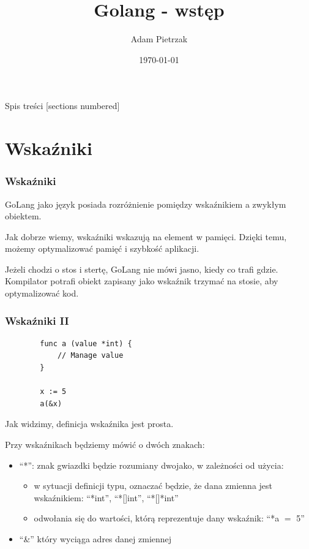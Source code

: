 \documentclass[10pt]{beamer}
\title{Golang - wstęp}
\date{\today}
\author{Adam Pietrzak}
\institute{}
\newcommand{\quotes}[1]{``#1''}
\begin{document}
\maketitle

\begin{frame}{Spis treści}
  [sections numbered]
  \tableofcontents%
\end{frame}

\section[Wskaźniki]{Wskaźniki}
\begin{frame}[fragile]
    \frametitle{Wskaźniki}
    GoLang jako język posiada rozróżnienie pomiędzy wskaźnikiem a zwykłym obiektem.

    Jak dobrze wiemy, wskaźniki wskazują na element w pamięci. Dzięki temu, 
    możemy optymalizować pamięć i szybkość aplikacji.

    Jeżeli chodzi o stos i stertę, GoLang nie mówi jasno, kiedy co trafi gdzie.
    Kompilator potrafi obiekt zapisany jako wskaźnik trzymać na stosie, aby
    optymalizować kod.
\end{frame}

\begin{frame}[fragile]
    \frametitle{Wskaźniki II}
    \begin{verbatim}
        func a (value *int) {
            // Manage value
        }

        x := 5
        a(&x)
    \end{verbatim}

    Jak widzimy, definicja wskaźnika jest prosta. 
    
    Przy wskaźnikach będziemy mówić o dwóch znakach:
    \begin{itemize}
        \item \quotes{*}: znak gwiazdki będzie rozumiany dwojako, w zależności od użycia:
        \begin{itemize}
            \item w sytuacji definicji typu, oznaczać będzie, że dana zmienna jest wskaźnikiem: \quotes{*int},
            \quotes{*[]int}, \quotes{*[]*int}
            \item odwołania się do wartości, którą reprezentuje dany wskaźnik: \quotes{*a $=$ 5}
        \end{itemize}
        \item \quotes{\&} który wyciąga adres danej zmiennej
    \end{itemize}
\end{frame}
\end{document}

